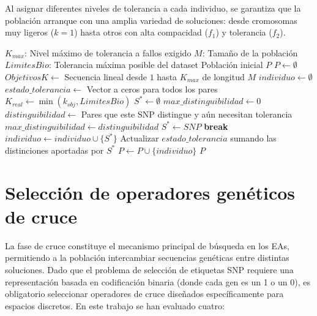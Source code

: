 Al asignar diferentes niveles de tolerancia a cada individuo, se garantiza que la población arranque con una amplia variedad de soluciones: desde cromosomas muy ligeros ($k=1$) hasta otros con alta compacidad ($f_1$) y tolerancia ($f_2$).

\begin{algorithm}[H]
\caption{Inicialización dinámica de multitolerancia (\textit{greedy\_multi})}
\begin{algorithmic}[1]
\Require $K_{max}$: Nivel máximo de tolerancia a fallos exigido
\Require $M$: Tamaño de la población
\Require $LimitesBio$: Tolerancia máxima posible del dataset
\Ensure Población inicial $P$
\State $P \gets \emptyset$ 
\State $ObjetivosK \gets$ Secuencia lineal desde $1$ hasta $K_{max}$ de longitud $M$
    \State $individuo \gets \emptyset$
    \State $estado\_tolerancia \gets$ Vector a ceros para todos los pares
    \State $K_{real} \gets \min(k_{obj}, LimitesBio)$
     
        \State $S^* \gets \emptyset$ 
        \State $max\_distinguibilidad \gets 0$ 
            \State $distinguibilidad \gets$ Pares que este SNP distingue y aún necesitan tolerancia
                \State $max\_distinguibilidad \gets distinguibilidad$
                \State $S^* \gets SNP$
            \EndIf
        \EndFor
         \textbf{break} \EndIf
        \State $individuo \gets individuo \cup \{S^*\}$
        \State Actualizar $estado\_tolerancia$ sumando las distinciones aportadas por $S^*$ 
    \EndWhile
    \State $P \gets P \cup \{individuo\}$
\EndFor
\State \Return $P$
\end{algorithmic}
\end{algorithm}

\section{Selección de operadores genéticos de cruce}

La fase de cruce constituye el mecanismo principal de búsqueda en los EAs, permitiendo a la población intercambiar secuencias genéticas entre distintas soluciones. Dado que el problema de selección de etiquetas SNP requiere una representación basada en codificación binaria (donde cada gen es un 1 o un 0), es obligatorio seleccionar operadores de cruce diseñados específicamente para espacios discretos. En este trabajo se han evaluado cuatro:

